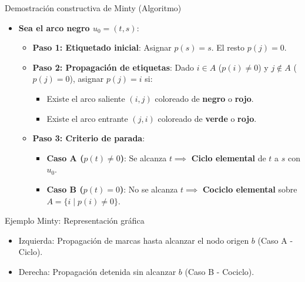 \documentclass[
  ignorenonframetext,
]{beamer}
\providecommand{\tightlist}{%
  \setlength{\itemsep}{0pt}\setlength{\parskip}{0pt}}
\begin{document}
\begin{frame}{Demostración constructiva de Minty (Algoritmo)}
\label{demostraciuxf3n-constructiva-de-minty-algoritmo}
\begin{itemize}
\tightlist
\item
  \textbf{Sea el arco negro \(u_0 = (t, s)\)}:

  \begin{itemize}
  \tightlist
  \item
    \textbf{Paso 1: Etiquetado inicial}: Asignar \(p(s) = s\). El resto
    \(p(j) = 0\).
  \item
    \textbf{Paso 2: Propagación de etiquetas}: Dado \(i \in A\)
    (\(p(i) \neq 0\)) y \(j \notin A\) (\(p(j) = 0\)), asignar
    \(p(j) = i\) si:

    \begin{itemize}
    \tightlist
    \item
      Existe el arco saliente \((i, j)\) coloreado de \textbf{negro} o
      \textbf{rojo}.
    \item
      Existe el arco entrante \((j, i)\) coloreado de \textbf{verde} o
      \textbf{rojo}.
    \end{itemize}
  \item
    \textbf{Paso 3: Criterio de parada}:

    \begin{itemize}
    \tightlist
    \item
      \textbf{Caso A (\(p(t) \neq 0\))}: Se alcanza \(t \implies\)
      \textbf{Ciclo elemental} de \(t\) a \(s\) con \(u_0\).
    \item
      \textbf{Caso B (\(p(t) = 0\))}: No se alcanza \(t \implies\)
      \textbf{Cociclo elemental} sobre \(A = \{i \mid p(i) \neq 0\}\).
    \end{itemize}
  \end{itemize}
\end{itemize}
\end{frame}

\begin{frame}{Ejemplo Minty: Representación gráfica}
\label{ejemplo-minty-representaciuxf3n-gruxe1fica}
\begin{itemize}
\tightlist
\item
  Izquierda: Propagación de marcas hasta alcanzar el nodo origen \(b\)
  (Caso A - Ciclo).
\item
  Derecha: Propagación detenida sin alcanzar \(b\) (Caso B - Cociclo).
\end{itemize}
\end{frame}
\end{document}
